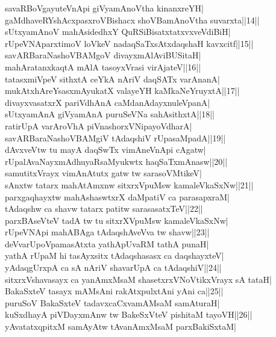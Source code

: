 \documentclass{article}
\begin{document}
savaRBoVgayuteVnApi giVyamAnoVtha kinanxreYH|\\
gaMdhaveRYshAcxpasxroVBishacx shoVBamAnoVtha suvarxta||14||\\
sUtxyamAnoV mahAsidedhxY QuRSiBisatxtatxvxveVdiBiH|\\
rUpeVNAparxtimoV loVkeV nadaqSaTxsAtxdaqshaH kavxcitf||15||\\
savARBaraNashoVBAMgoV divayxmAlAviBUSitaH|\\
mahAratanxkaqtA mAlA tasoyxVrasi virAjateV||16||\\
tatasxmiVpeV sithxtA ceYkA nAriV daqSATx varAnanA|\\
mukAtxhAreYsasxmAyukatX valayeYH kaMkaNeYruyxtA||17||\\
divayxvasatxrX pariVdhAnA caMdanAdayxnuleVpanA|\\
sUtxyamAnA giVyamAnA puruSeVNa sahAsithxtA||18||\\
ratirUpA varAroVhA piVnashorxVNipayoVdharA|\\
savARBaraNashoVBAMgiV tAdaqshiV rUpasaMpadA||19||\\
dAvxveVtw tu mayA daqSwTx vimAneVnApi cAgatw|\\
rUpalAvaNayxmAdhuyaRsaMyukwtx haqSaTxmAnasw||20||\\
samutitxVrayx vimAnAtutx gatw tw sarasoVMtikeV|\\
sAnxtw tatarx mahAtAmxnw sitxrxVpuMsw kamaleVkaSxNw||21||\\
parxgaqhayxtw mahAshaswtxrX daMpatiV ca parasapxraM|\\
tAdaqshw ca shavw tatarx patitw sarasasatxTeV||22||\\
parxBAseVteV tadA tw tu sitxrXVpuMsw kamaleVkaSxNw|\\
rUpeVNApi mahABAga tAdaqshAveVva tw shavw||23||\\
deVvarUpoVpamasAtxta yathApUvaRM tathA punaH|\\
yathA rUpaM hi tasAyxsitx tAdaqshasasx ca daqshayxteV|\\
yAdaqgUrxpA ca sA nAriV shavarUpA ca tAdaqshiV||24||\\
sitxrxVshavasayx ca yanAmxMsaM shasetxrxVNoVtikxVrayx sA tataH|\\
BakaSxteV  tasayx mAMsAni rakAtxpulxtAni yAni ca||25||\\
puruSoV BakaSxteV tadavxcaCxvamAMsaM samAturaH|\\
kuSxdhayA piVDayxmAnw tw BakeSxVteV pishitaM tayoVH||26||\\
yAvatatxqpitxM samAyAtw tAvanAmxMsaM parxBakiSxtaM|\\
\end{document}

